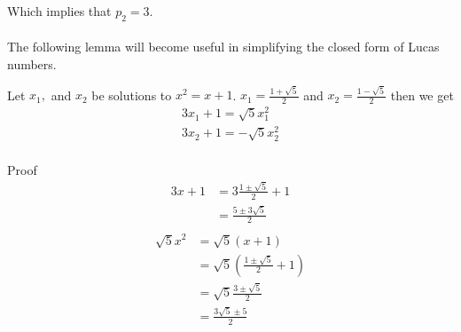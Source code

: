 \documentclass[a4paper]{article}
\begin{document}
Which implies that $p_2 = 3$.
\\
\\
The following lemma will become useful in simplifying the closed form of Lucas numbers.
\begin{theorem}\label{lucas lemma}
Let $x_1,$ and $x_2$ be solutions to $x^2 = x+1$.
$x_1 = \frac{1 + \sqrt{5}}{2}$ and
$x_2 = \frac{1 - \sqrt{5}}{2}$ then we get
\begin{equation*}
\begin{aligned}
3x_1 + 1 = \sqrt{5} x_1^2  \\
3x_2 + 1 = -\sqrt{5} x_2^2  \\
\end{aligned}
\end{equation*}

Proof
\begin{equation*}
\begin{split}
3x + 1 &= 3 \frac{1 \pm \sqrt{5}}{2} + 1 \\
&= \frac{5 \pm 3\sqrt{5}}{2} \\
\end{split}
\end{equation*}
\begin{equation*}
\begin{split}
\sqrt{5} x^2 &= \sqrt{5} (x + 1) \\
&= \sqrt{5} (\frac{1 \pm \sqrt{5}}{2} + 1) \\
&= \sqrt{5} \frac{3 \pm \sqrt{5}}{2}  \\
&= \frac{3\sqrt{5} \pm 5}{2}  \\
\end{split}
\end{equation*}
\end{theorem}
\end{document}
